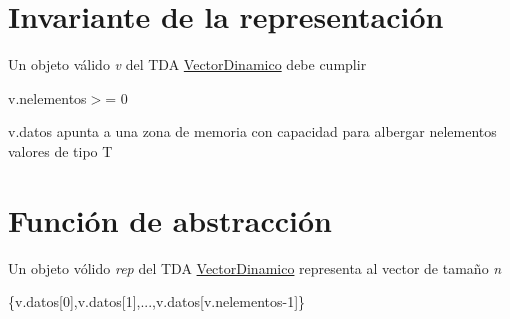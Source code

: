 \hypertarget{repVectorDinamico_invVectorDinamico}{}\section{Invariante de la representación}\label{repVectorDinamico_invVectorDinamico}
Un objeto válido {\itshape v} del T\+DA \hyperlink{classVectorDinamico}{Vector\+Dinamico} debe cumplir
\begin{DoxyItemize}
\item {\ttfamily v.\+nelementos$>$=} 0
\item {\ttfamily v.\+datos} apunta a una zona de memoria con capacidad para albergar {\ttfamily nelementos} valores de tipo {\ttfamily T} 
\end{DoxyItemize}\hypertarget{repVectorDinamico_faVectorDinamico}{}\section{Función de abstracción}\label{repVectorDinamico_faVectorDinamico}
Un objeto vólido {\itshape rep} del T\+DA \hyperlink{classVectorDinamico}{Vector\+Dinamico} representa al vector de tamaño {\itshape n} 

\{v.\+datos\mbox{[}0\mbox{]},v.\+datos\mbox{[}1\mbox{]},...,v.\+datos\mbox{[}v.\+nelementos-\/1\mbox{]}\} 